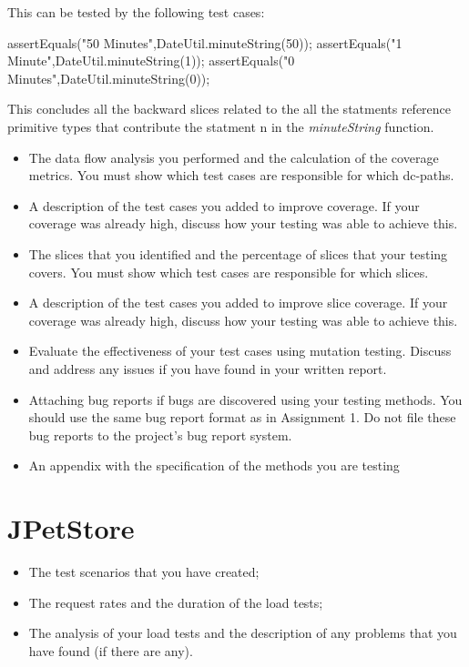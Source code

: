 \documentclass[fontsize=12pt,paper=letter,twoside]{scrartcl}
\begin{document}
This can be tested by the following test cases:
\begin{code}
assertEquals("50 Minutes",DateUtil.minuteString(50));
assertEquals("1 Minute",DateUtil.minuteString(1));
assertEquals("0 Minutes",DateUtil.minuteString(0));
\end{code}

This concludes all the backward slices related to the all the statments reference primitive types that contribute the statment n in the \emph{minuteString} function.




\begin{itemize}
\item The data flow analysis you performed and the calculation of the coverage metrics. You must
show which test cases are responsible for which dc-paths.
\item A description of the test cases you added to improve coverage. If your coverage was already high,
discuss how your testing was able to achieve this.
\item The slices that you identified and the percentage of slices that your testing covers. You must
show which test cases are responsible for which slices.
\item A description of the test cases you added to improve slice coverage. If your coverage was
already high, discuss how your testing was able to achieve this.
\item Evaluate the effectiveness of your test cases using mutation testing. Discuss and address any
issues if you have found in your written report.
\item Attaching bug reports if bugs are discovered using your testing methods. You should use the
same bug report format as in Assignment 1. Do not file these bug reports to the project’s bug
report system.
\item An appendix with the specification of the methods you are testing
\end{itemize}

\section{JPetStore}

\begin{itemize}
\item The test scenarios that you have created;
\item The request rates and the duration of the load tests;
\item The analysis of your load tests and the description of any problems that you have found (if there
are any).
\end{itemize}
\end{document}
